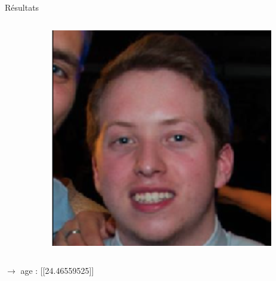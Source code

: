 \documentclass[compress]{beamer}
\begin{document}
\begin{frame}{Résultats}
  \begin{columns}
    \begin{column}{0.6\linewidth}
      \inputminted[fontsize=\scriptsize]{python}{code3.py}
    \end{column}
    \begin{column}{0.4\linewidth}
      \centering
      \includegraphics[width=\linewidth]{resources/jerem}
    \end{column}
  \end{columns}
    $\rightarrow$ age : [[24.46559525]]
\end{frame}
\end{document}
